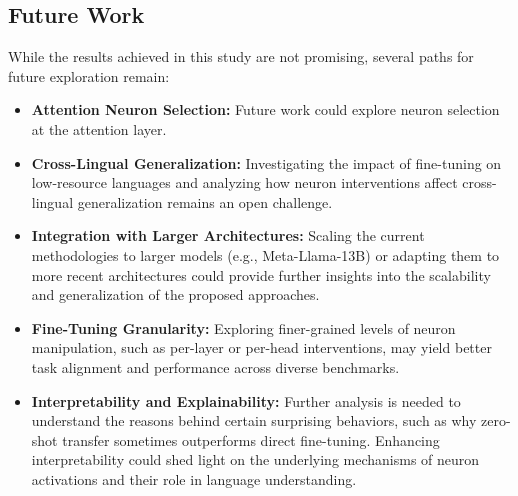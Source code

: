 \subsection{Future Work}
While the results achieved in this study are not promising, several paths for future exploration remain:

\begin{itemize}
	\item \textbf{Attention Neuron Selection:} Future work could explore neuron selection at the attention layer. 
	
	\item \textbf{Cross-Lingual Generalization:} Investigating the impact of fine-tuning on low-resource languages and analyzing how neuron interventions affect cross-lingual generalization remains an open challenge.
	
	\item \textbf{Integration with Larger Architectures:} Scaling the current methodologies to larger models (e.g., Meta-Llama-13B) or adapting them to more recent architectures could provide further insights into the scalability and generalization of the proposed approaches.
	
	\item \textbf{Fine-Tuning Granularity:} Exploring finer-grained levels of neuron manipulation, such as per-layer or per-head interventions, may yield better task alignment and performance across diverse benchmarks.
	
	\item \textbf{Interpretability and Explainability:} Further analysis is needed to understand the reasons behind certain surprising behaviors, such as why zero-shot transfer sometimes outperforms direct fine-tuning. Enhancing interpretability could shed light on the underlying mechanisms of neuron activations and their role in language understanding.
\end{itemize}






